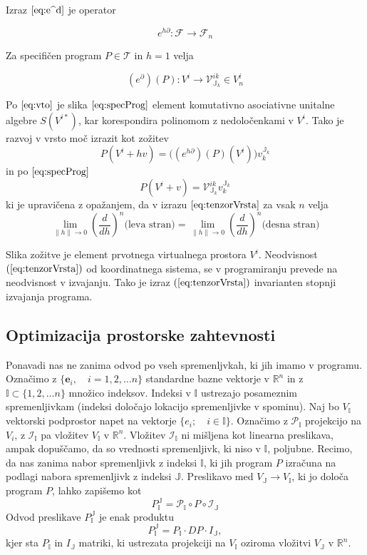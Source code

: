\documentclass{article}
\newcommand{\RR}{\mathbb{R}}
\newcommand{\II}{\mathbb{I}}
\newcommand{\JJ}{\mathbb{J}}
\newcommand{\T}{\mathcal{T}}
\newcommand{\VV}{\mathcal{V}}
\newcommand{\e}{\mathbf{e}}
\newcommand{\F}{\mathcal{F}}
\newcommand{\D}{\partial}
\begin{document}
 Izraz $\eqref{eq:e^d}$ je operator
 
 \begin{equation}
 	e^{h\D}:\F\to\F_n
 \end{equation}
 
 Za specifičen program $P\in\T$ in $h=1$ velja
 
 \begin{equation}\label{eq:specProg}
 	(e^{\D})(P):V^i\to \VV^{ik}_{\JJ_k}\in V_n^i
 \end{equation}
 
  Po $\eqref{eq:vto}$ je slika $\eqref{eq:specProg}$ element komutativno asociativne unitalne algebre $S(V^{i*})$, kar korespondira polinomom z nedoločenkami v $V^i$. Tako je razvoj v vrsto moč izrazit kot zožitev
  \begin{equation}\label{eq:tenzorVrsta}
  	P(V^i+hv) = \Big((e^{h\D})(P)(V^i)\Big)v^{\JJ_k}_{k}
  \end{equation}
  in po $\eqref{eq:specProg}$
  $$P(V^i+v) = \VV^{ik}_{\JJ_k}v^{\JJ_k}_{k}$$
 ki je upravičena z opažanjem, da v izrazu $\eqref{eq:tenzorVrsta}$ za vsak $n$ velja
 $$\lim\limits_{\lVert h\rVert\to 0}(\frac{d}{dh})^n\text{(leva stran)}=\lim\limits_{\lVert h\rVert\to 0}(\frac{d}{dh})^n\text{(desna stran)}$$
 
 Slika zožitve je element prvotnega virtualnega prostora $V^i$. Neodvisnost $(\ref{eq:tenzorVrsta})$ od koordinatnega sistema, se v programiranju prevede na neodvisnost v izvajanju. Tako je izraz $(\ref{eq:tenzorVrsta})$ invarianten stopnji izvajanja programa.   
 
 \subsection{Optimizacija prostorske zahtevnosti}
 Ponavadi nas ne zanima odvod po vseh spremenljvkah, ki jih imamo v programu.
 Označimo z $\{\e_i,\quad i=1,2,\ldots n\}$ standardne bazne vektorje v $\RR^n$ in z
 $\II\subset\{1,2,\ldots n\}$ množico indeksov. Indeksi v $\II$ ustrezajo
 posameznim spremenljivkam (indeksi določajo lokacijo spremenljivke v spominu). Naj bo $V_\II$ vektorski
 podprostor napet na vektorje $\{e_i;\quad i\in\II\}$. Označimo z 
 $\mathcal{P}_\II$ projekcijo na $V_i$, z $\mathcal{I}_\II$ pa vložitev $V_\II$ v
 $\RR^n$. Vložitev $\mathcal{I}_\II$ ni mišljena kot linearna preslikava, ampak
 dopuščamo, da so vrednosti spremenljivk, ki niso v $\II$, poljubne. Recimo, da nas zanima nabor spremenljivk z indeksi $\II$, ki jih
 program $P$ izračuna na podlagi nabora spremenljivk z indeksi $\mathbb{J}$.
 Preslikavo med $V_\JJ\to V_\II$, ki jo določa program $P$, lahko zapišemo kot
 \begin{equation}
   \label{eq:zozitev}
   P^{\JJ}_{\II}=\mathcal{P}_\II\circ P\circ \mathcal{I}_\JJ 
 \end{equation}
 Odvod preslikave $ P^{\JJ}_{\II}$ je enak produktu
 \begin{equation*}
   P^{\JJ}_{\II}=P_\II\cdot DP\cdot I_\JJ,   
 \end{equation*}
 kjer sta $P_\II$ in  $I_\JJ$ matriki, ki ustrezata projekciji na $V_\II$ oziroma
 vložitvi $V_\JJ$ v $\RR^n$.
 
\end{document}
